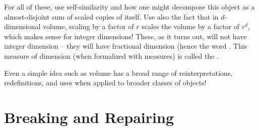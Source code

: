 \documentclass[12pt]{article}
\begin{document}
For all of these, use self-similarity and how one might decompose this object as
a almost-disjoint sum of scaled copies of itself. Use also the fact that in
$d$-dimensional volume, scaling by a factor of $r$ scales the volume by a factor
of $r^d$, which makes sense for integer dimensions! These, as it turns out, will
not have integer dimension -- they will have fractional dimension (hence the
word . This measure of dimension (when formalized with measures) is
called the . 
\begin{idea}
  Even a simple idea such as volume has a broad range of reinterpretations,
  redefinitions, and uses when applied to broader classes of objects! 
\end{idea}




\section{Breaking and Repairing}
\end{document}
